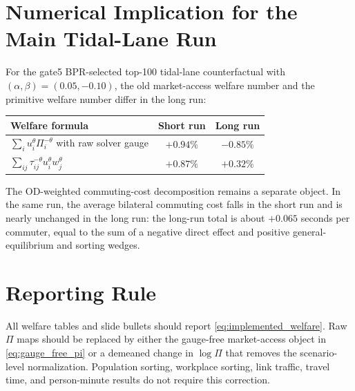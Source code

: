 \documentclass[11pt]{article}
\begin{document}
\section{Numerical Implication for the Main Tidal-Lane Run}

For the gate5 BPR-selected top-100 tidal-lane counterfactual with $(\alpha,\beta)=(0.05,-0.10)$, the old market-access welfare number and the primitive welfare number differ in the long run:
\begin{center}
\begin{tabular}{lcc}
\toprule
Welfare formula & Short run & Long run \\
\midrule
$\sum_i u_i^\theta\Pi_i^{-\theta}$ with raw solver gauge
    & $+0.94\%$ & $-0.85\%$ \\
$\sum_{ij}\tau_{ij}^{-\theta}u_i^\theta w_j^\theta$
    & $+0.87\%$ & $+0.32\%$ \\
\bottomrule
\end{tabular}
\end{center}
The OD-weighted commuting-cost decomposition remains a separate object. In the same run, the average bilateral commuting cost falls in the short run and is nearly unchanged in the long run: the long-run total is about $+0.065$ seconds per commuter, equal to the sum of a negative direct effect and positive general-equilibrium and sorting wedges.

\section{Reporting Rule}

All welfare tables and slide bullets should report \eqref{eq:implemented_welfare}. Raw $\Pi$ maps should be replaced by either the gauge-free market-access object in \eqref{eq:gauge_free_pi} or a demeaned change in $\log \Pi$ that removes the scenario-level normalization. Population sorting, workplace sorting, link traffic, travel time, and person-minute results do not require this correction.
\end{document}
